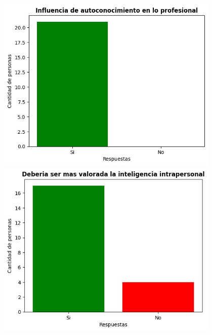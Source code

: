 \begin{center}
\includegraphics[width=0.8\textwidth]{./assets/img/grafica-8.jpeg}
\includegraphics[width=0.8\textwidth]{./assets/img/grafica-9.jpeg}
\end{center}
